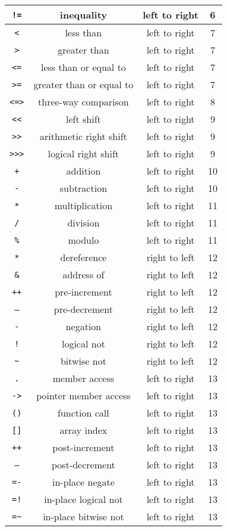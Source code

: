 \documentclass[letterpaper,12pt]{book}
\begin{document}
\begin{longtable}{|c|c|c|c|}
\texttt{!=} & inequality & left to right & 6\\
\hline
\texttt{<} & less than & left to right & 7\\
\hline
\texttt{>} & greater than & left to right & 7\\
\hline
\texttt{<=} & less than or equal to & left to right & 7\\
\hline
\texttt{>=} & greater than or equal to & left to right & 7\\
\hline
\texttt{<=>} & three-way comparison & left to right & 8\\
\hline
\texttt{<<} & left shift & left to right & 9\\
\hline
\texttt{>>} & arithmetic right shift & left to right & 9\\
\hline
\texttt{>>>} & logical right shift & left to right & 9\\
\hline
\texttt{+} & addition & left to right & 10\\
\hline
\texttt{-} & subtraction & left to right & 10\\
\hline
\texttt{*} & multiplication & left to right & 11\\
\hline
\texttt{/} & division & left to right & 11\\
\hline
\texttt{\%} & modulo & left to right & 11\\
\hline
\texttt{*} & dereference & right to left & 12\\
\hline
\texttt{\&} & address of & right to left & 12\\
\hline
\texttt{++} & pre-increment & right to left & 12\\
\hline
\texttt{--} & pre-decrement & right to left & 12\\
\hline
\texttt{-} & negation & right to left & 12\\
\hline
\texttt{!} & logical not & right to left & 12\\
\hline
\texttt{\~{}} & bitwise not & right to left & 12\\
\hline
\texttt{.} & member access & left to right & 13\\
\hline
\texttt{->} & pointer member access & left to right & 13\\
\hline
\texttt{()} & function call & left to right & 13\\
\hline
\texttt{[]} & array index & left to right & 13\\
\hline
\texttt{++} & post-increment & left to right & 13\\
\hline
\texttt{--} & post-decrement & left to right & 13\\
\hline
\texttt{=-} & in-place negate & left to right & 13\\
\hline
\texttt{=!} & in-place logical not & left to right & 13\\
\hline
\texttt{=\~{}} & in-place bitwise not & left to right & 13\\
\hline
\end{longtable}
\end{document}
